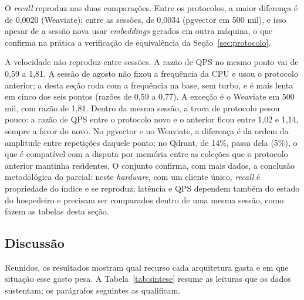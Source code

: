 O \textit{recall} reproduz nas duas comparações. Entre os protocolos, a maior diferença é de 0,0020 (Weaviate); entre as sessões, de 0,0034 (pgvector em 500 mil), e isso apesar de a sessão nova usar \textit{embeddings} gerados em outra máquina, o que confirma na prática a verificação de equivalência da Seção~\ref{sec:protocolo}.

A velocidade não reproduz entre sessões. A razão de QPS no mesmo ponto vai de 0,59 a 1,81. A sessão de agosto não fixou a frequência da CPU e usou o protocolo anterior; a desta seção roda com a frequência na base, sem turbo, e é mais lenta em cinco dos seis pontos (razões de 0,59 a 0,77). A exceção é o Weaviate em 500 mil, com razão de 1,81. Dentro da mesma sessão, a troca de protocolo pesou pouco: a razão de QPS entre o protocolo novo e o anterior ficou entre 1,02 e 1,14, sempre a favor do novo. No pgvector e no Weaviate, a diferença é da ordem da amplitude entre repetições daquele ponto; no Qdrant, de 14\%, passa dela (5\%), o que é compatível com a disputa por memória entre as coleções que o protocolo anterior mantinha residentes. O conjunto confirma, com mais dados, a conclusão metodológica do parcial: neste \textit{hardware}, com um cliente único, \textit{recall} é propriedade do índice e se reproduz; latência e QPS dependem também do estado do hospedeiro e precisam ser comparados dentro de uma mesma sessão, como fazem as tabelas desta seção.

\subsection{Discussão}

\label{sec:discussao}

Reunidos, os resultados mostram qual recurso cada arquitetura gasta e em que situação esse gasto pesa. A Tabela~\ref{tab:sintese} resume as leituras que os dados sustentam; os parágrafos seguintes as qualificam.

